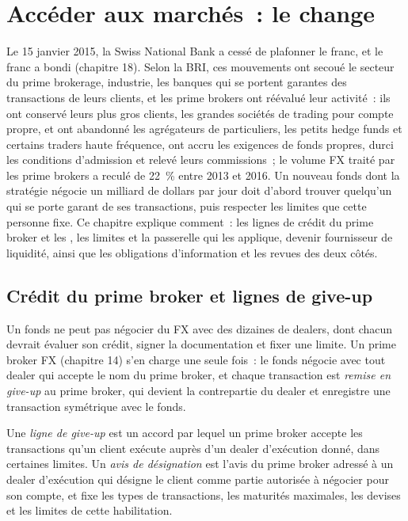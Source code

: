 \chapter{Accéder aux marchés~: le change}\label{ch:m2:getting-access-fx}

Le 15 janvier 2015, la Swiss National Bank a cessé de plafonner le franc, et le franc
a bondi (chapitre 18). Selon la BRI, ces mouvements ont secoué le secteur du prime brokerage,
industrie, les banques qui se portent garantes des transactions de leurs clients, et les prime brokers
ont réévalué leur activité~: ils ont conservé leurs plus gros clients, les grandes
sociétés de trading pour compte propre, et ont abandonné les agrégateurs de particuliers, les petits hedge funds et certains
traders haute fréquence, ont accru les exigences de fonds propres, durci les conditions d'admission et
relevé leurs commissions~; le volume FX traité par les prime brokers a reculé de 22~\% entre 2013 et 2016. Un nouveau fonds
dont la stratégie négocie un milliard de dollars par jour doit d'abord trouver quelqu'un qui se porte garant de
ses transactions, puis respecter les limites que cette personne fixe. Ce chapitre explique
comment~: les lignes de crédit du prime broker et les , les limites et la passerelle qui les applique,
devenir fournisseur de liquidité, ainsi que les obligations d'information et les revues des deux côtés.

\section{Crédit du prime broker et lignes de give-up}

Un fonds ne peut pas négocier du FX avec des dizaines de dealers, dont chacun devrait évaluer son
crédit, signer la documentation et fixer une limite. Un prime broker FX (chapitre 14) s'en charge
une seule fois~: le fonds négocie avec tout dealer qui accepte le nom du prime broker, et chaque
transaction est \emph{remise en give-up} au prime broker, qui devient la contrepartie du dealer
et enregistre une transaction symétrique avec le fonds.

\begin{definition}\label{def:m2:getting-access-fx:giveup}
Une \emph{ligne de give-up} est un accord par lequel un prime broker accepte les
transactions qu'un client exécute auprès d'un dealer d'exécution donné, dans certaines limites. Un
\emph{avis de désignation} est l'avis du prime broker adressé à un
dealer d'exécution qui désigne le client comme partie autorisée à négocier pour son
compte, et fixe les types de transactions, les maturités maximales, les devises et les limites de cette
habilitation.
\end{definition}

